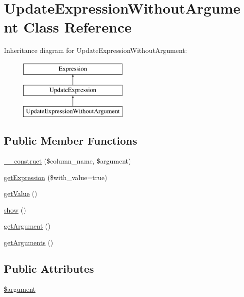\hypertarget{classUpdateExpressionWithoutArgument}{\section{Update\-Expression\-Without\-Argument Class Reference}
\label{classUpdateExpressionWithoutArgument}
}
Inheritance diagram for Update\-Expression\-Without\-Argument\-:\begin{figure}[H]
\begin{center}
\leavevmode
\includegraphics[height=3.000000cm]{classUpdateExpressionWithoutArgument}
\end{center}
\end{figure}
\subsection*{Public Member Functions}
\begin{DoxyCompactItemize}
\item 
\hyperlink{classUpdateExpressionWithoutArgument_ac13520a40ff21971e64875d9b6f3672c}{\-\_\-\-\_\-construct} (\$column\-\_\-name, \$argument)
\item 
\hyperlink{classUpdateExpressionWithoutArgument_a26520d45130223bf455d335c6187a769}{get\-Expression} (\$with\-\_\-value=true)
\item 
\hyperlink{classUpdateExpressionWithoutArgument_a901f3b067ddafc55479d2728cb1b5ef2}{get\-Value} ()
\item 
\hyperlink{classUpdateExpressionWithoutArgument_a01a16802a0645ae717c010ede1b92f7e}{show} ()
\item 
\hyperlink{classUpdateExpressionWithoutArgument_a6b1b1611de45acf42d4a10f71343de38}{get\-Argument} ()
\item 
\hyperlink{classUpdateExpressionWithoutArgument_ae196b9aa4c42acda72b3ec725b1b7bed}{get\-Arguments} ()
\end{DoxyCompactItemize}
\subsection*{Public Attributes}
\begin{DoxyCompactItemize}
\item 
\hyperlink{classUpdateExpressionWithoutArgument_a1cecdad1efab4b00f0211e7973c1225c}{\$argument}
\end{DoxyCompactItemize}


